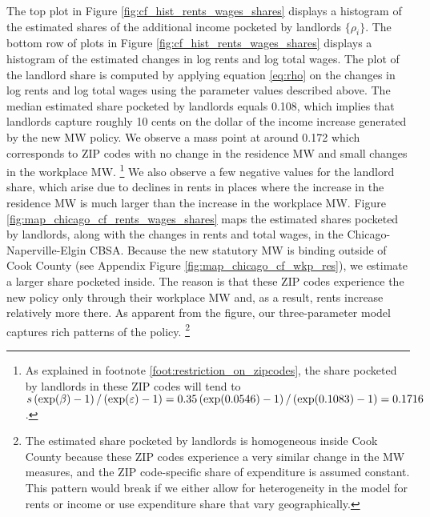 The top plot in Figure \ref{fig:cf_hist_rents_wages_shares} displays a histogram 
of the estimated shares of the additional income pocketed by landlords 
$\{\rho_i\}$.
The bottom row of plots in Figure \ref{fig:cf_hist_rents_wages_shares} displays 
a histogram of the estimated changes in log rents and log total wages.
The plot of the landlord share is computed by applying equation \eqref{eq:rho} 
on the changes in log rents and log total wages using the parameter values
described above.
The median estimated share pocketed by landlords equals 0.108, which implies 
that landlords capture roughly 10 cents on the dollar of the income increase 
generated by the new MW policy.
We observe a mass point at around 0.172 which corresponds to ZIP codes with
no change in the residence MW and small changes in the workplace MW.%
\footnote{As explained in footnote \ref{foot:restriction_on_zipcodes}, the 
share pocketed by landlords in these ZIP codes will tend to
$s \left(\exp(\beta)-1\right)/\left(\exp(\varepsilon)-1\right) 
= 0.35 \left(\exp(\textnormal{0.0546})-1\right)/
     \left(\exp(0.1083)-1\right)
= 0.1716$.}
We also observe a few negative values for the landlord share, which
arise due to declines in rents in places where the increase in the residence MW
is much larger than the increase in the workplace MW.
Figure \ref{fig:map_chicago_cf_rents_wages_shares} maps the estimated shares 
pocketed by landlords, along with the changes in rents and total wages, in the 
Chicago-Naperville-Elgin CBSA.
Because the new statutory MW is binding outside of Cook County 
(see Appendix Figure \ref{fig:map_chicago_cf_wkp_res}), 
we estimate a larger share pocketed inside.
The reason is that these ZIP codes experience the new policy only through
their workplace MW and, as a result,
rents increase relatively more there.
As apparent from the figure, our three-parameter model captures rich patterns
of the policy.%
\footnote{The estimated share pocketed by landlords is homogeneous inside 
Cook County because these ZIP codes experience a very similar change in the 
MW measures, and the ZIP code-specific share of expenditure is assumed constant.
This pattern would break if we either allow for heterogeneity in the model for 
rents or income or use expenditure share that vary geographically.}

